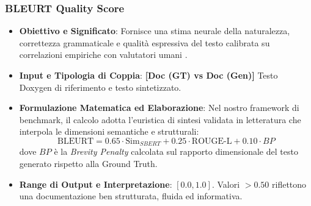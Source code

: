 \subsubsection{BLEURT Quality Score}
\label{subsubsec:bleurt}
\begin{itemize}[leftmargin=*, label=\textbullet]
    \item \textbf{Obiettivo e Significato}: Fornisce una stima neurale della naturalezza, correttezza grammaticale e qualità espressiva del testo calibrata su correlazioni empiriche con valutatori umani \cite{sellam_bleurt_2020}.
    \item \textbf{Input e Tipologia di Coppia}: \textbf{[Doc (GT) vs Doc (Gen)]} Testo Doxygen di riferimento e testo sintetizzato.
    \item \textbf{Formulazione Matematica ed Elaborazione}: Nel nostro framework di benchmark, il calcolo adotta l'euristica di sintesi validata in letteratura che interpola le dimensioni semantiche e strutturali:
    \begin{equation}
        \text{BLEURT} = 0.65 \cdot \text{Sim}_{SBERT} + 0.25 \cdot \text{ROUGE-L} + 0.10 \cdot BP
        \label{eq:bleurt_formula}
    \end{equation}
    dove $BP$ è la \emph{Brevity Penalty} calcolata sul rapporto dimensionale del testo generato rispetto alla Ground Truth.
    \item \textbf{Range di Output e Interpretazione}: $[0.0, 1.0]$. Valori $> 0.50$ riflettono una documentazione ben strutturata, fluida ed informativa.
\end{itemize}

